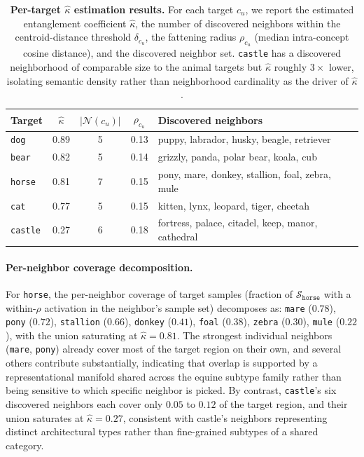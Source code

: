 \begin{table}[ht]
\centering
\small
\setlength{\tabcolsep}{6pt}
\begin{tabular}{lcccl}
\toprule
\textbf{Target} & $\hat\kappa$ & $|\mathcal{N}(c_u)|$ & $\rho_{c_u}$ & \textbf{Discovered neighbors} \\
\midrule
\texttt{dog}    & 0.89 & 5 & 0.13 & puppy, labrador, husky, beagle, retriever \\
\texttt{bear}   & 0.82 & 5 & 0.14 & grizzly, panda, polar bear, koala, cub \\
\texttt{horse}  & 0.81 & 7 & 0.15 & pony, mare, donkey, stallion, foal, zebra, mule \\
\texttt{cat}    & 0.77 & 5 & 0.15 & kitten, lynx, leopard, tiger, cheetah \\
\texttt{castle} & 0.27 & 6 & 0.18 & fortress, palace, citadel, keep, manor, cathedral \\
\bottomrule
\end{tabular}
\caption{
\textbf{Per-target $\hat\kappa$ estimation results.} For each target $c_u$, we report the estimated entanglement coefficient $\hat\kappa$, the number of discovered neighbors within the centroid-distance threshold $\delta_{c_u}$, the fattening radius $\rho_{c_u}$ (median intra-concept cosine distance), and the discovered neighbor set. \texttt{castle} has a discovered neighborhood of comparable size to the animal targets but $\hat\kappa$ roughly $3\times$ lower, isolating semantic density rather than neighborhood cardinality as the driver of $\hat\kappa$. }
\label{tab:kappa_per_target}
\end{table}

\paragraph{Per-neighbor coverage decomposition.}
For \texttt{horse}, the per-neighbor coverage of target samples (fraction of $\mathcal{S}_{\texttt{horse}}$ with a within-$\rho$ activation in the neighbor's sample set) decomposes as: \texttt{mare} ($0.78$), \texttt{pony} ($0.72$), \texttt{stallion} ($0.66$), \texttt{donkey} ($0.41$), \texttt{foal} ($0.38$), \texttt{zebra} ($0.30$), \texttt{mule} ($0.22$), with the union saturating at $\hat\kappa = 0.81$. 
The strongest individual neighbors (\texttt{mare}, \texttt{pony}) already cover most of the target region on their own, and several others contribute substantially, indicating that overlap is supported by a representational manifold shared across the equine subtype family rather than being sensitive to which specific neighbor is picked. By contrast, \texttt{castle}'s six discovered neighbors each cover only $0.05$ to $0.12$ of the target region, and their union saturates at $\hat\kappa = 0.27$, consistent with castle's neighbors representing distinct architectural types rather than fine-grained subtypes of a shared category.

